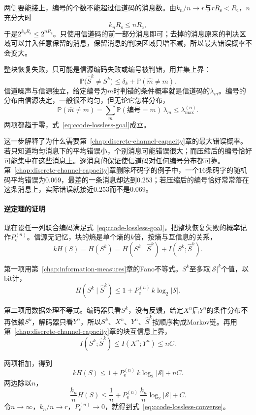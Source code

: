 两侧要能接上，编号的个数不能超过信道码的消息数。由$k_n/n\to r$与$rR_{\mathrm{s}}<R_{\mathrm{c}}$，$n$充分大时
\[
 k_nR_{\mathrm{s}}\leq nR_{\mathrm{c}} ,
\]
于是$2^{k_nR_{\mathrm{s}}}\leq2^{nR_{\mathrm{c}}}$。只使用信道码的前一部分消息即可；去掉的消息原来的判决区域可以并入任意保留的消息，保留消息的判决区域只增不减，所以最大错误概率不会变大。

整块恢复失败，只可能是信源编码失败或编号被判错，用并集上界：
\[
 \mathbb{P}\bigl(\hat{S}^{k}\neq S^{k}\bigr)\leq\delta_{k}+\mathbb{P}(\hat{m}\neq m) .
\]
信道噪声与信源独立，给定编号为$m$时判错的条件概率就是信道码的$\lambda_m$。编号的分布由信源决定，一般很不均匀，但无论它怎样分布，
\[
 \mathbb{P}(\hat{m}\neq m)=\sum_{m}\mathbb{P}(\text{编号}=m)\,\lambda_m\leq\lambda_{\max}^{(n)} .
\]
两项都趋于零，式~\eqref{eq:ccode-lossless-goal}成立。

这一步解释了为什么需要第~\ref{chap:discrete-channel-capacity}章的最大错误概率。若只知道均匀消息下的平均错误小，个别消息可能错误很大；而压缩后的编号恰好可能集中在这些消息上。逐消息的保证使信道码对任何编号分布都可靠。第~\ref{chap:discrete-channel-capacity}章删除坏码字的例子中，一个$16$条码字的随机码平均错误为$0.069$，最差的一条消息却达到$0.253$；若压缩后的编号恰好常常落在这条消息上，实际错误就接近$0.253$而不是$0.069$。

\paragraph{逆定理的证明}
现在设任一列联合编码满足式~\eqref{eq:ccode-lossless-goal}，把整块恢复失败的概率记作$P_{\mathrm{e}}^{(n)}$。信源无记忆，块的熵是单个熵的$k$倍，按熵与互信息的关系，
\[
 kH(S)=H(S^{k})=H(S^{k}\mid\hat{S}^{k})+I(S^{k};\hat{S}^{k}) .
\]

第一项用第~\ref{chap:information-measures}章的Fano不等式。$S^{k}$至多取$\lvert\mathcal{S}\rvert^{k}$个值，以bit计，
\[
 H(S^{k}\mid\hat{S}^{k})\leq1+P_{\mathrm{e}}^{(n)}\,k\log_2\lvert\mathcal{S}\rvert .
\]

第二项用数据处理不等式。编码器只看$S^{k}$，没有反馈，给定$X^{n}$后$Y^{n}$的条件分布不再依赖$S^{k}$，解码器只看$Y^{n}$，所以$S^{k}$、$X^{n}$、$Y^{n}$、$\hat{S}^{k}$按顺序构成Markov链。再用第~\ref{chap:discrete-channel-capacity}章的块互信息上界，
\[
 I(S^{k};\hat{S}^{k})\leq I(X^{n};Y^{n})\leq nC .
\]

两项相加，得到
\[
 kH(S)\leq1+P_{\mathrm{e}}^{(n)}\,k\log_2\lvert\mathcal{S}\rvert+nC .
\]
两边除以$n$，
\[
 \frac{k_n}{n}H(S)\leq\frac1n+P_{\mathrm{e}}^{(n)}\,\frac{k_n}{n}\log_2\lvert\mathcal{S}\rvert+C .
\]
令$n\to\infty$，$k_n/n\to r$，$P_{\mathrm{e}}^{(n)}\to0$，就得到式~\eqref{eq:ccode-lossless-converse}。

